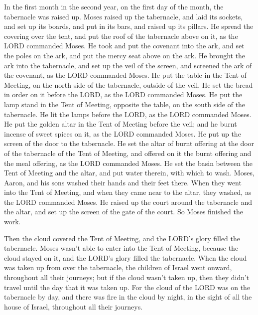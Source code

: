 In the first month in the second year, on the first day of
the month, the tabernacle was raised up.  Moses raised up
the tabernacle, and laid its sockets, and set up its boards, and put in
its bars, and raised up its pillars.  He spread the
covering over the tent, and put the roof of the tabernacle above on it,
as the LORD commanded Moses.  He took and put the covenant
into the ark, and set the poles on the ark, and put the mercy seat above
on the ark.  He brought the ark into the tabernacle, and
set up the veil of the screen, and screened the ark of the covenant, as
the LORD commanded Moses.  He put the table in the Tent of
Meeting, on the north side of the tabernacle, outside of the veil.
 He set the bread in order on it before the LORD, as the
LORD commanded Moses.  He put the lamp stand in the Tent of
Meeting, opposite the table, on the south side of the tabernacle.
 He lit the lamps before the LORD, as the LORD commanded
Moses.  He put the golden altar in the Tent of Meeting
before the veil;  and he burnt incense of sweet spices on
it, as the LORD commanded Moses.  He put up the screen of
the door to the tabernacle.  He set the altar of burnt
offering at the door of the tabernacle of the Tent of Meeting, and
offered on it the burnt offering and the meal offering, as the LORD
commanded Moses.  He set the basin between the Tent of
Meeting and the altar, and put water therein, with which to wash.
 Moses, Aaron, and his sons washed their hands and their
feet there.  When they went into the Tent of Meeting, and
when they came near to the altar, they washed, as the LORD commanded
Moses.  He raised up the court around the tabernacle and
the altar, and set up the screen of the gate of the court. So Moses
finished the work.

 Then the cloud covered the Tent of Meeting, and the LORD's
glory filled the tabernacle.  Moses wasn't able to enter
into the Tent of Meeting, because the cloud stayed on it, and the LORD's
glory filled the tabernacle.  When the cloud was taken up
from over the tabernacle, the children of Israel went onward, throughout
all their journeys;  but if the cloud wasn't taken up, then
they didn't travel until the day that it was taken up.  For
the cloud of the LORD was on the tabernacle by day, and there was fire
in the cloud by night, in the sight of all the house of Israel,
throughout all their journeys.
